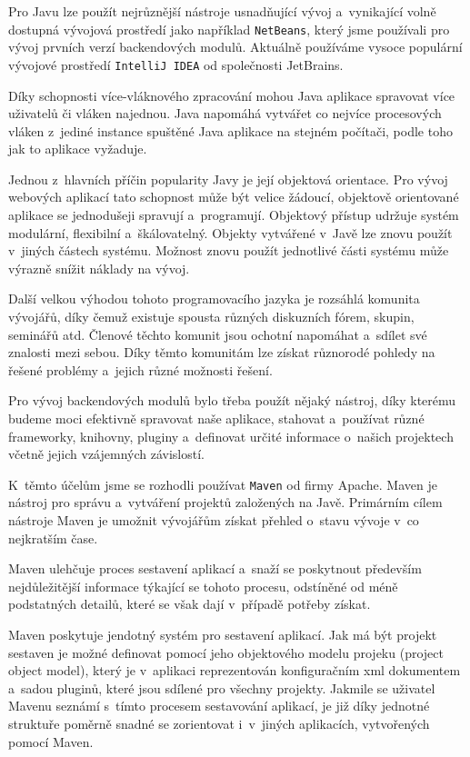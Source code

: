 \documentclass[twoside, 12pt]{article}
\begin{document}
{%
Pro Javu lze použít nejrůznější nástroje usnadňující vývoj a~vynikající volně dostupná vývojová prostředí
jako například \texttt{NetBeans}, který jsme používali pro vývoj prvních verzí backendových modulů.
Aktuálně používáme vysoce populární vývojové prostředí \texttt{IntelliJ IDEA}
od společnosti JetBrains.

Díky schopnosti více-vláknového zpracování
mohou Java aplikace spravovat více uživatelů či vláken najednou.
Java napomáhá vytvářet co nejvíce procesových vláken z~jediné instance
spuštěné Java aplikace na stejném počítači, podle toho jak to aplikace vyžaduje.


Jednou z~hlavních příčin popularity Javy je její objektová orientace.
Pro vývoj webových aplikací tato schopnost může být velice žádoucí,
objektově orientované aplikace se jednodušeji spravují a~programují.
Objektový přístup udržuje systém modulární, flexibilní a~škálovatelný.
Objekty vytvářené v~Javě lze znovu použít v~jiných částech systému.
Možnost znovu použít jednotlivé části systému může výrazně snížit náklady na vývoj.

Další velkou výhodou tohoto programovacího jazyka je rozsáhlá komunita vývojářů,
díky čemuž existuje spousta různých diskuzních fórem,
skupin, seminářů atd. Členové těchto komunit
jsou ochotní napomáhat a~sdílet své znalosti mezi sebou.
Díky těmto komunitám lze získat různorodé pohledy na řešené problémy
a~jejich různé možnosti řešení.
\cite{xicom}


Pro vývoj backendových modulů bylo třeba použít nějaký nástroj,
díky kterému budeme moci efektivně spravovat naše aplikace,
stahovat a~používat různé frameworky, knihovny, pluginy
a~definovat určité informace o~našich projektech včetně jejich vzájemných závislostí.

K~těmto účelům jsme se rozhodli používat \texttt{Maven} od firmy Apache.
Maven je nástroj pro správu a~vytváření projektů založených na Javě.
Primárním cílem nástroje Maven je umožnit vývojářům získat přehled o~stavu
vývoje v~co nejkratším čase.

Maven ulehčuje proces sestavení aplikací a~snaží se poskytnout především
nejdůležitější informace týkající se tohoto procesu,
odstíněné od méně podstatných detailů,
které se však dají v~případě potřeby získat.

Maven poskytuje jendotný systém pro sestavení aplikací.
Jak má být projekt sestaven je možné definovat pomocí
jeho objektového modelu projeku (project object model),
který je v~aplikaci reprezentován konfiguračním xml dokumentem
a~sadou pluginů, které jsou sdílené pro všechny projekty.
Jakmile se uživatel Mavenu seznámí s~tímto procesem sestavování aplikací,
je již díky jednotné struktuře poměrně snadné se zorientovat i~v~jiných aplikacích,
vytvořených pomocí Maven.

}
\end{document}

